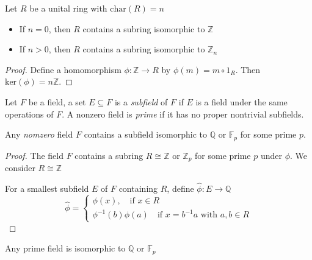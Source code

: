 \begin{theorem}
Let $R$ be a unital ring with $\mbox{char}(R)=n$
\begin{itemize}
\item
If $n=0$, then $R$ contains a subring isomorphic to $\mathbb{Z}$
\item
If $n>0$, then $R$ contains a subring isomorphic to $\mathbb{Z}_n$
\end{itemize}
\end{theorem}
\begin{proof}
Define a homomorphism $\phi:\mathbb{Z}\to R$ by $\phi(m)=m\circ 1_R$. Then $\mbox{ker}(\phi)=n\mathbb{Z}$.
\end{proof}
\begin{definition}
Let $F$ be a field, a set $E\subseteq F$ is a \emph{subfield} of $F$ if $E$ is a field under the same operations of $F$. A nonzero field is \emph{prime} if it has no proper nontrivial subfields.
\end{definition}
\begin{corollary}
Any \emph{nomzero} field $F$ contains a subfield isomorphic to $\mathbb{Q}$ or $\mathbb{F}_p$ for some prime $p$.
\end{corollary}
\begin{proof}
The field $F$ contains a subring $R\cong\mathbb{Z}$ or $\mathbb{Z}_p$ for some prime $p$ under $\phi$. We consider $R\cong\mathbb{Z}$

For a smallest subfield $E$ of $F$ containing $R$, define $\hat\phi:E\to\mathbb{Q}$
\[
\hat\phi=\left\{
\begin{aligned}
\phi(x),\quad\mbox{if $x\in R$}\\
\phi^{-1}(b)\phi(a)\quad\mbox{if $x=b^{-1}a$ with $a,b\in R$}
\end{aligned}
\right.
\]
\end{proof}
\begin{corollary}
Any prime field is isomorphic to $\mathbb{Q}$ or $\mathbb{F}_p$
\end{corollary}






















